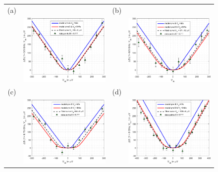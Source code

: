 \begin{figure}[hptb]
	\begin{center}
		\begin{tabular}{c c c c}
			(a) & & (b) & \\
			& \includegraphics[width = 6.5 cm]{./chap2/nu_4_3_RF_noise_vs_Vdc_at_3_5GHz} &
			& \includegraphics[width = 6.5 cm]{./chap2/nu_4_3_RF_noise_vs_Vdc_at_6_5GHz} \\
			(c) & & (d) & \\
			& \includegraphics[width = 6.5 cm]{./chap2/nu_4_3_RF_noise_vs_Vdc_at_6_75GHz} &
			& \includegraphics[width = 6.5 cm]{./chap2/nu_4_3_RF_noise_vs_Vdc_at_8GHz}
		\end{tabular}
	\end{center}
	

\end{figure}
